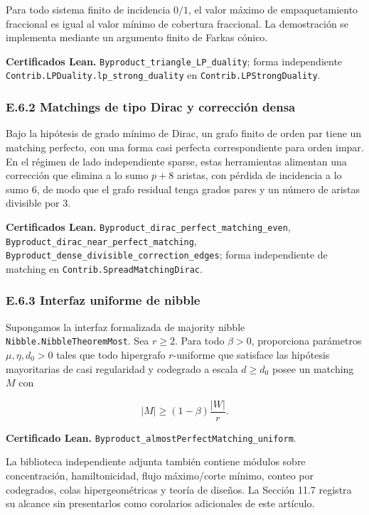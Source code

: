 \documentclass[
  spanish,
  11pt,
  a4paper,
]{article}
\begin{document}
Para todo sistema finito de incidencia \(0/1\), el valor máximo de empaquetamiento fraccional es igual al valor mínimo de cobertura fraccional. La demostración se implementa mediante un argumento finito de Farkas cónico.

\textbf{Certificados Lean.} \texttt{Byproduct\_triangle\_LP\_duality}; forma independiente \texttt{Contrib.LPDuality.lp\_strong\_duality} en \texttt{Contrib.LPStrongDuality}.

\subsubsection{E.6.2 Matchings de tipo Dirac y corrección densa}\label{e.6.2-matchings-de-tipo-dirac-y-correcciuxf3n-densa}

Bajo la hipótesis de grado mínimo de Dirac, un grafo finito de orden par tiene un matching perfecto, con una forma casi perfecta correspondiente para orden impar. En el régimen de lado independiente sparse, estas herramientas alimentan una corrección que elimina a lo sumo \(p+8\) aristas, con pérdida de incidencia a lo sumo \(6\), de modo que el grafo residual tenga grados pares y un número de aristas divisible por \(3\).

\textbf{Certificados Lean.} \texttt{Byproduct\_dirac\_perfect\_matching\_even}, \texttt{Byproduct\_dirac\_near\_perfect\_matching}, \texttt{Byproduct\_dense\_divisible\_correction\_edges}; forma independiente de matching en \texttt{Contrib.SpreadMatchingDirac}.

\subsubsection{E.6.3 Interfaz uniforme de nibble}\label{e.6.3-interfaz-uniforme-de-nibble}

Supongamos la interfaz formalizada de majority nibble \texttt{Nibble.NibbleTheoremMost}. Sea \(r\ge2\). Para todo \(\beta>0\), proporciona parámetros \(\mu,\eta,d_0>0\) tales que todo hipergrafo \(r\)-uniforme que satisface las hipótesis mayoritarias de casi regularidad y codegrado a escala \(d\ge d_0\) posee un matching \(M\) con

\[|M|\ge(1-\beta)\frac{|W|}{r}.\]

\textbf{Certificado Lean.} \texttt{Byproduct\_almostPerfectMatching\_uniform}.

La biblioteca independiente adjunta también contiene módulos sobre concentración, hamiltonicidad, flujo máximo/corte mínimo, conteo por codegrados, colas hipergeométricas y teoría de diseños. La Sección 11.7 registra su alcance sin presentarlos como corolarios adicionales de este artículo.
\end{document}
